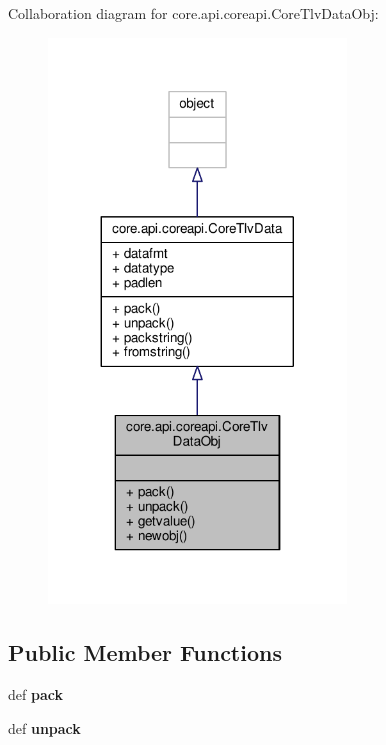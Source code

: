 Collaboration diagram for core.\+api.\+coreapi.\+Core\+Tlv\+Data\+Obj\+:
\nopagebreak
\begin{figure}[H]
\begin{center}
\leavevmode
\includegraphics[width=224pt]{classcore_1_1api_1_1coreapi_1_1_core_tlv_data_obj__coll__graph}
\end{center}
\end{figure}
\subsection*{Public Member Functions}
\begin{DoxyCompactItemize}
\item 
\hypertarget{classcore_1_1api_1_1coreapi_1_1_core_tlv_data_obj_a78835f3992a2101142f7b22ee47588a5}{def {\bfseries pack}}\label{classcore_1_1api_1_1coreapi_1_1_core_tlv_data_obj_a78835f3992a2101142f7b22ee47588a5}

\item 
\hypertarget{classcore_1_1api_1_1coreapi_1_1_core_tlv_data_obj_a3ea7d12eec5cb3b8f400d7e3674f2fc3}{def {\bfseries unpack}}\label{classcore_1_1api_1_1coreapi_1_1_core_tlv_data_obj_a3ea7d12eec5cb3b8f400d7e3674f2fc3}

\end{DoxyCompactItemize}
